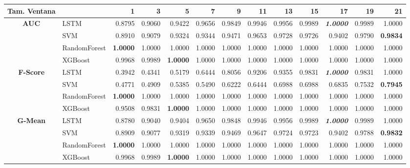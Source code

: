 \begin{table}[H]
\centering
\begin{adjustbox}{max width=12cm}
	\begin{tabular}{|c|l|r|r|r|r|r|r|r|r|r|r|r|}
		\hline
		\textbf{Tam. Ventana} &         &      1  &      3  &      5  &      7  &      9  &      11 &      13 &      15 &      17 &      19 &      21 \\
		\hline
		\textbf{AUC} &  LSTM &  0.8795 &  0.9060 &  0.9422 &  0.9656 &  0.9849 &  0.9946 &  0.9956 &  0.9989 & \textit{ \textbf{  1.0000 } } &  0.9989 &  1.0000 \\
		&  SVM &  0.8910 &  0.9079 &  0.9324 &  0.9344 &  0.9471 &  0.9653 &  0.9728 &  0.9726 &  0.9402 &  0.9790 & \textbf{  0.9834 } \\
		&  RandomForest & \textbf{  1.0000 } &  1.0000 &  1.0000 &  1.0000 &  1.0000 &  1.0000 &  1.0000 &  1.0000 &  1.0000 &  1.0000 &  1.0000 \\
		&  XGBoost &  0.9968 &  0.9989 & \textbf{  1.0000 } &  1.0000 &  1.0000 &  1.0000 &  1.0000 &  1.0000 &  1.0000 &  1.0000 &  1.0000 \\
		\hline
		\textbf{F-Score} &  LSTM &  0.3942 &  0.4341 &  0.5179 &  0.6444 &  0.8056 &  0.9206 &  0.9355 &  0.9831 & \textit{ \textbf{  1.0000 } } &  0.9831 &  1.0000 \\
		&  SVM &  0.4771 &  0.4909 &  0.5385 &  0.5490 &  0.6222 &  0.6444 &  0.6988 &  0.6988 &  0.6835 &  0.7532 & \textbf{  0.7945 } \\
		&  RandomForest & \textbf{  1.0000 } &  1.0000 &  1.0000 &  1.0000 &  1.0000 &  1.0000 &  1.0000 &  1.0000 &  1.0000 &  1.0000 &  1.0000 \\
		&  XGBoost &  0.9508 &  0.9831 & \textbf{  1.0000 } &  1.0000 &  1.0000 &  1.0000 &  1.0000 &  1.0000 &  1.0000 &  1.0000 &  1.0000 \\
		\hline
		\textbf{G-Mean} &  LSTM &  0.8780 &  0.9040 &  0.9404 &  0.9650 &  0.9848 &  0.9946 &  0.9956 &  0.9989 & \textit{ \textbf{  1.0000 } } &  0.9989 &  1.0000 \\
		&  SVM &  0.8909 &  0.9077 &  0.9319 &  0.9339 &  0.9469 &  0.9647 &  0.9724 &  0.9723 &  0.9402 &  0.9788 & \textbf{  0.9832 } \\
		&  RandomForest & \textbf{  1.0000 } &  1.0000 &  1.0000 &  1.0000 &  1.0000 &  1.0000 &  1.0000 &  1.0000 &  1.0000 &  1.0000 &  1.0000 \\
		&  XGBoost &  0.9968 &  0.9989 & \textbf{  1.0000 } &  1.0000 &  1.0000 &  1.0000 &  1.0000 &  1.0000 &  1.0000 &  1.0000 &  1.0000 \\

\end{tabular}
\end{adjustbox}
\end{table}
